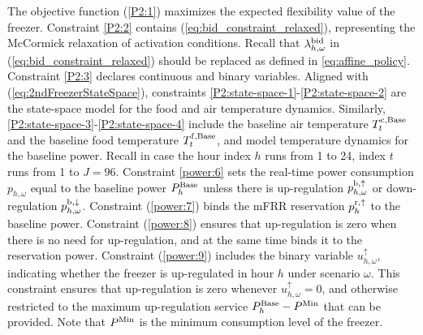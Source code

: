 \documentclass[11pt,a4paper]{article}
\begin{document}
The objective function (\ref{P2:1}) maximizes the expected flexibility value of the freezer.
%
Constraint \eqref{P2:2} contains
(\ref{eq:bid_constraint_relaxed}), representing the McCormick relaxation of activation conditions. Recall that $\lambda^{\rm{bid}}_{h, \omega}$ in (\ref{eq:bid_constraint_relaxed}) should be replaced as defined in \eqref{eq:affine_policy}. Constraint \eqref{P2:3} declares continuous and binary variables.
%
%
%
%
Aligned with (\ref{eq:2ndFreezerStateSpace}), constraints \eqref{P2:state-space-1}-\eqref{P2:state-space-2} are the state-space model for the food and air temperature dynamics. Similarly, \eqref{P2:state-space-3}-\eqref{P2:state-space-4} include the baseline air temperature $T^{\rm{c},\text{Base}}_{t}$ and the   baseline food temperature $T^{\rm{f},\text{Base}}_{t}$, and model temperature dynamics for the baseline power. %
Recall in case the hour index $h$ runs from 1 to 24, index $t$ runs from 1 to $J=96$.
%
Constraint \eqref{power:6} sets the real-time power consumption $p_{h,\omega}$ equal to the baseline power $P^{\rm{Base}}_{h}$ unless there is up-regulation $p^{\rm{b}, \uparrow}_{h,\omega}$ or down-regulation $p^{\rm{b}, \downarrow}_{h,\omega}$.
%
Constraint (\ref{power:7}) binds the mFRR reservation $p_{h}^{\rm{r},\uparrow}$ to the baseline power.
%
Constraint (\ref{power:8}) ensures that up-regulation is zero when there is no need for up-regulation, and at the same time binds it to the reservation power.
%
Constraint (\ref{power:9}) includes the binary variable $u^{\uparrow}_{h,\omega}$, indicating whether the freezer is up-regulated in hour $h$ under scenario $\omega$. This constraint ensures that up-regulation is zero whenever $u^{\uparrow}_{h,\omega} = 0$, and otherwise restricted to the maximum up-regulation service $P^{\rm{Base}}_{h}-P^{\rm{Min}}$ that can be provided. Note that $P^{\rm{Min}}$ is the minimum consumption level of the freezer.
\end{document}
